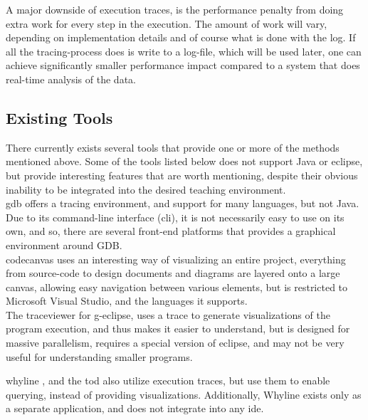 A major downside of execution traces, is the performance penalty from doing extra work for every step in the execution.
The amount of work will vary, depending on implementation details and of course what is done with the log.
If all the tracing-process does is write to a log-file, which will be used later, one can achieve significantly smaller performance impact compared to a system that does real-time analysis of the data.
~\\

\subsection{Existing Tools}\label{PreTools}
There currently exists several tools that provide one or more of the methods mentioned above.
Some of the tools listed below does not support Java or eclipse, but provide interesting features that are worth mentioning, despite their obvious inability to be integrated into the desired teaching environment.
~\\

\Gls{gdb} offers a tracing environment, and support for many languages, but not Java.
Due to its command-line interface (\gls{cli}), it is not necessarily easy to use on its own, and so, there are several front-end platforms that provides a graphical environment around GDB.
~\\

\Gls{codecanvas} uses an interesting way of visualizing an entire project, everything from source-code to design documents and diagrams are layered onto a large canvas, allowing easy navigation between various elements, but is restricted to Microsoft Visual Studio, and the languages it supports.
~\\

The \gls{traceviewer} \cite{Kranzlmuller} for g-eclipse, uses a trace to generate visualizations of the program execution, and thus makes it easier to understand, but is designed for massive parallelism, requires a special version of eclipse, and may not be very useful for understanding smaller programs.
~\\

\begin{sloppypar}
\Gls{whyline} \cite{ko2009}, and the \gls{tod} \cite{Pothier2007} also utilize execution traces, but use them to enable querying, instead of providing visualizations.
Additionally, Whyline exists only as a separate application, and does not integrate into any \gls{ide}.
~\\
\end{sloppypar}

